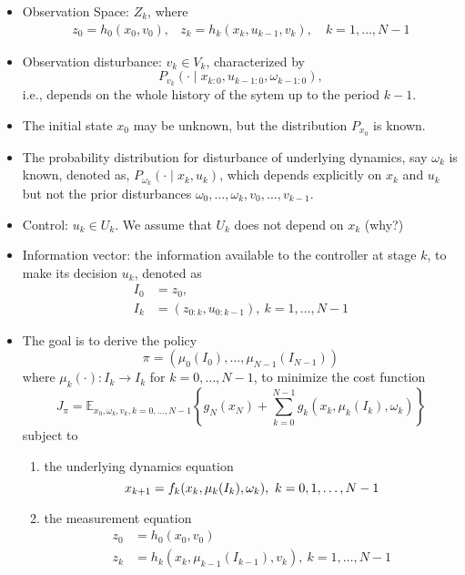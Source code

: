 \begin{itemize}
\item
Observation Space: $Z_k$, where
\[
\begin{array}{ll}
z_0=h_0(x_0,v_0),
&
z_k=h_k(x_k,u_{k-1},v_k),\quad
k=1,\dots,N-1
\end{array}
\]
\item
Observation disturbance: $v_k\in V_k$, characterized by
\[
P_{v_k}(\cdot\mid 
x_{k:0},u_{k-1:0},\omega_{k-1:0}
),
\]
i.e., depends on the whole history of the sytem up to the period $k-1$.
\item
The initial state $x_0$ may be unknown, but the distribution $P_{x_0}$ is known.
\item
The probability distribution for disturbance of underlying dynamics, say $\omega_k$ is known, denoted as, $P_{\omega_k}(\cdot\mid x_k,u_k)$, which depends explicitly on $x_k$ and $u_k$ but not the prior disturbances $\omega_0,\dots,\omega_k,v_0,\dots,v_{k-1}$.
\item
Control: $u_k\in U_k$. We assume that $U_k$ does not depend on $x_k$ (why?)
\item
Information vector: the information available to the controller at stage $k$, to make its decision $u_k$, denoted as
\begin{align*}
I_0&=z_0,\\
I_k&=(z_{0:k},u_{0:k-1}),\ k=1,\dots,N-1
\end{align*}
\item
The goal is to derive the policy
\[
\pi = (\mu_0(I_{0}),\dots,\mu_{N-1}(I_{N-1}))
\]
where $\mu_k(\cdot):I_k\to I_k$ for $k=0,\dots,N-1$, to minimize the cost function
\[
J_\pi = \mathbb{E}_{x_0,\omega_k,v_k, k=0,\dots,N-1}\left\{g_N(x_N)+\sum_{k=0}^{N-1}g_k(x_k,\mu_k(I_k),\omega_k)\right\}
\]
subject to
\begin{enumerate}
\item
the underlying dynamics equation
\begin{equation}
x_{k+1} = f_k(x_k,\mu_k(I_k),\omega_k), \ k=0,1,\dots,N-1\\
\end{equation}
\item
the measurement equation
\begin{equation}
\begin{aligned}
z_0&=h_0(x_0,v_0)\\
z_k&=h_k(x_k,\mu_{k-1}(I_{k-1}),v_k), \ k=1,\dots,N-1
\end{aligned}
\end{equation}
\end{enumerate}
\end{itemize}

